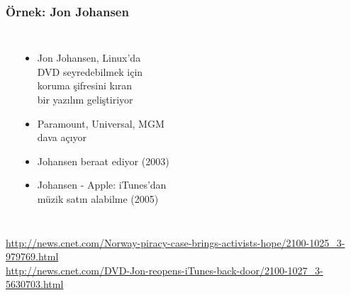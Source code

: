 \documentclass[dvipsnames]{beamer}
\theoremstyle{plain}
\begin{document}
\begin{frame}
  \frametitle{Örnek: Jon Johansen}

  \begin{columns}
    \begin{center}
    \end{center}

    \begin{itemize}
      \item Jon Johansen, Linux'da\\
        DVD seyredebilmek için\\
        koruma şifresini kıran\\
        bir yazılım geliştiriyor
      \item Paramount, Universal, MGM\\
        dava açıyor
      \item Johansen beraat ediyor (2003)

      \pause
      \medskip
      \item Johansen - Apple: iTunes'dan\\
        müzik satın alabilme (2005)
    \end{itemize}
  \end{columns}

  \medskip
  \tiny{\url{http://news.cnet.com/Norway-piracy-case-brings-activists-hope/2100-1025_3-979769.html}}\\
  \tiny{\url{http://news.cnet.com/DVD-Jon-reopens-iTunes-back-door/2100-1027_3-5630703.html}}\\
\end{frame}
\end{document}
